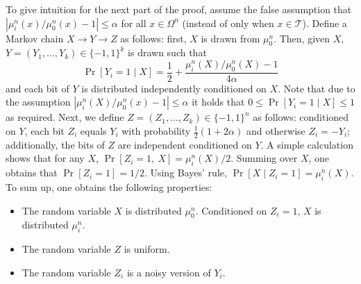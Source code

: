 \documentclass[final, 12pt]{colt2018}
\begin{document}
To give intuition for the next part of the proof, assume the false assumption that $\left| \mu^n_i(x)/ \mu_0^n(x) - 1\right| \le \alpha$ for all $x \in \Omega^n$ (instead of only when $x \in \mathcal{T}$). Define a Markov chain $X \to Y \to Z$ as follows: first, $X$ is drawn from $\mu_0^n$. Then, given $X$, $Y = (Y_1,\dots,Y_k) \in \{-1,1\}^k$ is drawn such that
\[
\Pr\left[ Y_i = 1 \mid X \right]
= \frac{1}{2} + \frac{\mu_i^n(X)/\mu_0^n(X)-1}{4\alpha}
\]
and each bit of $Y$ is distributed independently conditioned on $X$. Note that due to the assumption $|\mu_i^n(X)/\mu_0^n(x)-1|\le \alpha$ it holds that $0 \le \Pr[Y_i=1 \mid X] \le 1$ as required. Next, we define $Z = (Z_1,\dots,Z_k) \in \{-1,1\}^n$ as follows: conditioned on $Y$, each bit $Z_i$ equals $Y_i$ with probability $\frac{1}{2}(1+2\alpha)$ and otherwise $Z_i = -Y_i$; additionally, the bits of $Z$ are independent conditioned on $Y$. A simple calculation shows that for any $X$, $\Pr[Z_i = 1,\ X] = \mu_i^n(X)/2$. Summing over $X$, one obtains that $\Pr[Z_i = 1] = 1/2$. Using Bayes' rule, $\Pr[X \mid Z_i = 1] = \mu_i^n(X)$. To sum up, one obtains the following properties:
\begin{itemize}
\item The random variable $X$ is distributed $\mu_0^n$. Conditioned on $Z_i = 1$, $X$ is distributed $\mu_i^n$.
\item The random variable $Z$ is uniform.
\item The random variable $Z_i$ is a noisy version of $Y_i$.
\end{itemize}
\end{document}
